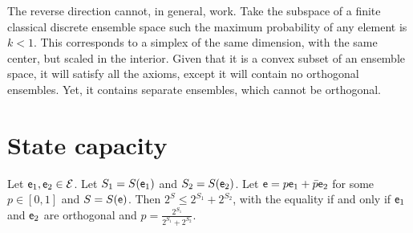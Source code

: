 \begin{remark}
	The reverse direction cannot, in general, work. Take the subspace of a finite classical discrete ensemble space such the maximum probability of any element is $k < 1$. This corresponds to a simplex of the same dimension, with the same center, but scaled in the interior. Given that it is a convex subset of an ensemble space, it will satisfy all the axioms, except it will contain no orthogonal ensembles. Yet, it contains separate ensembles, which cannot be orthogonal.
\end{remark}

\section{State capacity}

\begin{prop}\label{pm_es_exponentialEntropySubadditivity}
	Let $\mathsf{e}_1, \mathsf{e}_2 \in \mathcal{E}$. Let $S_1 = S(\mathsf{e}_1)$ and $S_2 = S(\mathsf{e}_2)$. Let $\mathsf{e} = p \mathsf{e}_1 + \bar{p} \mathsf{e}_2$ for some $p \in [0,1]$ and $S = S(\mathsf{e})$. Then $2^S \leq 2^{S_1} + 2^{S_2}$, with the equality if and only if $\mathsf{e}_1$ and $\mathsf{e}_2$ are orthogonal and $p = \frac{2^{S_1}}{2^{S_1} + 2^{S_2}}$.
\end{prop}

